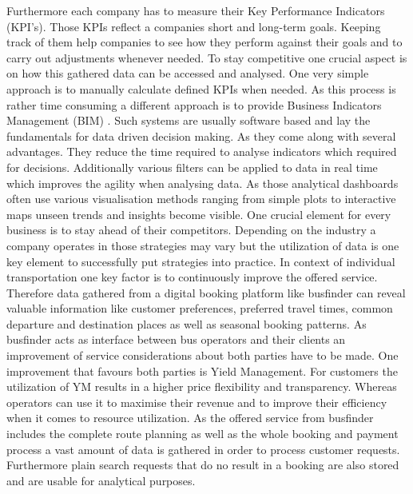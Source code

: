 Furthermore each company has to measure their Key Performance Indicators (KPI's). Those KPIs reflect a companies short and long-term goals. Keeping track of them help companies to see how they perform against their goals and to carry out adjustments whenever needed.\cite{kpi_imrpove_businiess} To stay competitive one crucial aspect is on how this gathered data can be accessed and analysed. One very simple approach is to manually calculate defined KPIs when needed. As this process is rather time consuming a different approach is to provide Business Indicators Management (BIM) \cite{kpi_imrpove_decision_making}. Such systems are usually software based and lay the fundamentals for data driven decision making. As they come along with several advantages. They reduce the time required to analyse indicators which required for decisions. Additionally various filters can be applied to data in real time which improves the agility when analysing data. As those analytical dashboards often use various visualisation methods ranging from simple plots to interactive maps unseen trends and insights become visible.
\newline
\newline 
One crucial element for every business is to stay ahead of their competitors. Depending on the industry a company operates in those strategies may vary but the utilization of data is one key element to successfully put strategies into practice.
In context of individual transportation one key factor is to continuously improve the offered service. Therefore data gathered from a digital booking platform like busfinder can reveal valuable information like customer preferences, preferred travel times, common departure and destination places as well as seasonal booking patterns.
\newline
\newline
As busfinder acts as interface between bus operators and their clients an improvement of service considerations about both parties have to be made. One improvement that favours both parties is Yield Management. For customers the utilization of YM results in a higher price flexibility and transparency. Whereas operators can use it to maximise their revenue and to improve their efficiency when it comes to resource utilization.\cite{yield_m} As the offered service from busfinder includes the complete route planning as well as the whole booking and payment process a vast amount of data is gathered in order to process customer requests. Furthermore plain search requests that do no result in a booking are also stored and are usable for analytical purposes.

